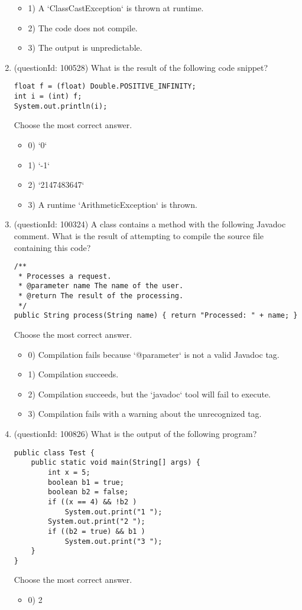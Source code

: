 \documentclass[12pt]{article}
\begin{document}
\begin{enumerate}[label=(\arabic*)]
\begin{itemize}
\item 1) A `ClassCastException` is thrown at runtime.

\item 2) The code does not compile.

\item 3) The output is unpredictable.

\end{itemize}
\item (questionId: 100528) What is the result of the following code snippet?
\begin{verbatim}
float f = (float) Double.POSITIVE_INFINITY;
int i = (int) f;
System.out.println(i);
\end{verbatim}
Choose the most correct answer. 
\begin{itemize}
\item 0) `0`

\item 1) `-1`

\item 2) `2147483647`

\item 3) A runtime `ArithmeticException` is thrown.

\end{itemize}
\item (questionId: 100324) A class contains a method with the following Javadoc comment. What is the result of attempting to compile the source file containing this code?
\begin{verbatim}
/**
 * Processes a request.
 * @parameter name The name of the user.
 * @return The result of the processing.
 */
public String process(String name) { return "Processed: " + name; }
\end{verbatim}
Choose the most correct answer. 
\begin{itemize}
\item 0) Compilation fails because `@parameter` is not a valid Javadoc tag.

\item 1) Compilation succeeds.

\item 2) Compilation succeeds, but the `javadoc` tool will fail to execute.

\item 3) Compilation fails with a warning about the unrecognized tag.

\end{itemize}
\item (questionId: 100826) What is the output of the following program?\n\begin{verbatim}
public class Test {
    public static void main(String[] args) {
        int x = 5;
        boolean b1 = true;
        boolean b2 = false;
        if ((x == 4) && !b2 )
            System.out.print("1 ");
        System.out.print("2 ");
        if ((b2 = true) && b1 )
            System.out.print("3 ");
    }
}
\end{verbatim}
Choose the most correct answer. 
\begin{itemize}
\item 0) 2


\end{itemize}
\end{enumerate}
\end{document}

